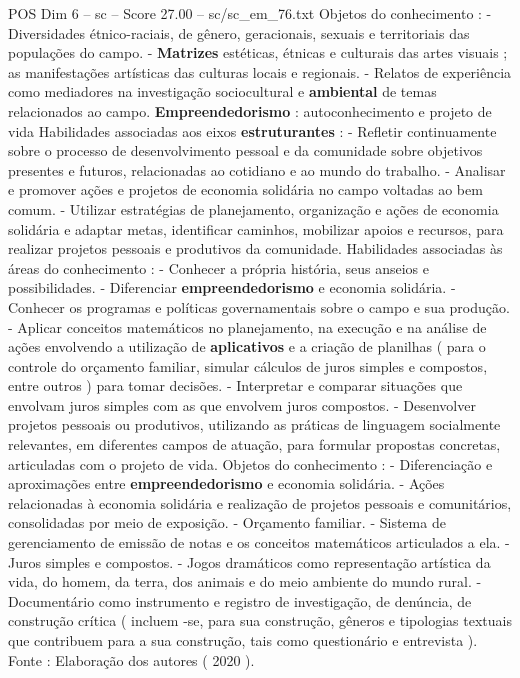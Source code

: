 \begin{textsample}{POS Dim 6 – sc – Score 27.00 – sc/sc\_em\_76.txt}
Objetos do conhecimento : - Diversidades étnico-raciais, de gênero, geracionais, sexuais e territoriais das populações do campo. - \textbf{Matrizes} estéticas, étnicas e culturais das artes visuais ; as manifestações artísticas das culturas locais e regionais. - Relatos de experiência como mediadores na investigação sociocultural e \textbf{ambiental} de temas relacionados ao campo. \textbf{Empreendedorismo} : autoconhecimento e projeto de vida Habilidades associadas aos eixos \textbf{estruturantes} : - Refletir continuamente sobre o processo de desenvolvimento pessoal e da comunidade sobre objetivos presentes e futuros, relacionadas ao cotidiano e ao mundo do trabalho. - Analisar e promover ações e projetos de economia solidária no campo voltadas ao bem comum. - Utilizar estratégias de planejamento, organização e ações de economia solidária e adaptar metas, identificar caminhos, mobilizar apoios e recursos, para realizar projetos pessoais e produtivos da comunidade.
Habilidades associadas às áreas do conhecimento : - Conhecer a própria história, seus anseios e possibilidades. - Diferenciar \textbf{empreendedorismo} e economia solidária. - Conhecer os programas e políticas governamentais sobre o campo e sua produção. - Aplicar conceitos matemáticos no planejamento, na execução e na análise de ações envolvendo a utilização de \textbf{aplicativos} e a criação de planilhas ( para o controle do orçamento familiar, simular cálculos de juros simples e compostos, entre outros ) para tomar decisões. - Interpretar e comparar situações que envolvam juros simples com as que envolvem juros compostos. - Desenvolver projetos pessoais ou produtivos, utilizando as práticas de linguagem socialmente relevantes, em diferentes campos de atuação, para formular propostas concretas, articuladas com o projeto de vida.
Objetos do conhecimento : - Diferenciação e aproximações entre \textbf{empreendedorismo} e economia solidária. - Ações relacionadas à economia solidária e realização de projetos pessoais e comunitários, consolidadas por meio de exposição. - Orçamento familiar. - Sistema de gerenciamento de emissão de notas e os conceitos matemáticos articulados a ela. - Juros simples e compostos. - Jogos dramáticos como representação artística da vida, do homem, da terra, dos animais e do meio ambiente do mundo rural. - Documentário como instrumento e registro de investigação, de denúncia, de construção crítica ( incluem -se, para sua construção, gêneros e tipologias textuais que contribuem para a sua construção, tais como questionário e entrevista ).
Fonte : Elaboração dos autores ( 2020 ).

\end{textsample}
